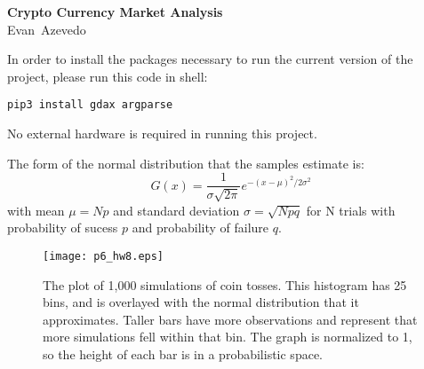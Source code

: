 \documentclass[12pt]{article}
\newcommand\thisis{Crypto Currency Market Analysis}
\newcommand\theauthor{Evan~Azevedo}
\begin{document}
\thispagestyle{firstpg}

\noindent
{\sffamily\bfseries\huge \thisis}\\

\noindent
{\large\sffamily \theauthor}

\vspace*{20bp}

\noindent
In order to install the packages necessary to run the current version of the project, please run this code in shell:

\lstset{language=UNIX}
\begin{lstlisting}
pip3 install gdax argparse
\end{lstlisting}

No external hardware is required in running this project.


The form of the normal distribution that the samples estimate is:
\begin{equation}
G(x) = \frac{1}{\sigma\sqrt{2\pi}}e^{-(x-\mu)^2/2\sigma^2}
\end{equation}
with mean $\mu = Np$ and standard deviation $\sigma = \sqrt{Npq}$ for N trials
with probability of sucess $p$ and probability of failure $q$.

\begin{figure}[h]
\begin{center}
\texttt{[image: p6\_hw8.eps]}
\vspace{-18bp}
\end{center}
\caption[]{\label{fig:sim}\small
The plot of 1,000 simulations of coin tosses. This histogram has 25 bins, and is overlayed with the normal distribution that it approximates. Taller bars have more observations and represent that more simulations fell within that bin. The graph is normalized to 1, so the height of each bar is in a probabilistic space.}
\end{figure}
\end{document}
